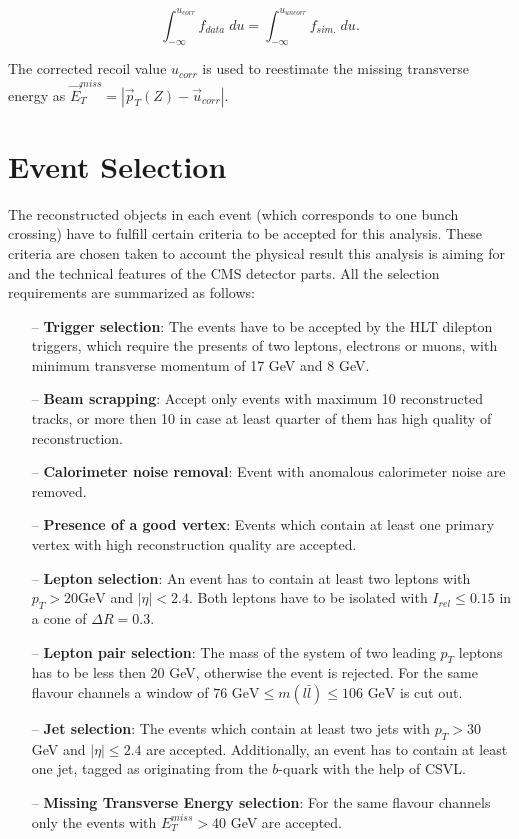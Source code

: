 \begin{equation}
 \int_{-\infty}^{u_{corr}} f_{data}\; du = \int_{-\infty}^{u_{uncorr}} f_{sim.}\; du.
\end{equation}

The corrected recoil value $u_{corr}$ is used to reestimate the missing transverse energy as $\vec{E}_{T}^{miss} = | \vec{p}_{T}(Z) - \vec{u}_{corr} |$.

\section{Event Selection}

The reconstructed objects in each event (which corresponds to one bunch crossing) have to fulfill certain criteria to be accepted for this analysis. These 
criteria are chosen taken to account the physical result this analysis is aiming for and the technical features of the CMS detector parts.
All the selection requirements are summarized as follows:

\begin{itemize}
 \item [--] \textbf{Trigger selection}: The events have to be accepted by the HLT dilepton triggers, which require the presents of two leptons, electrons or muons, with
 minimum transverse momentum of 17 GeV and 8 GeV. 
 \item [--] \textbf{Beam scrapping}: Accept only events with maximum 10 reconstructed tracks, or more then 10 in case at least quarter of them has high quality of reconstruction.
 \item [--] \textbf{Calorimeter noise removal}: Event with anomalous calorimeter noise are removed.
 \item [--] \textbf{Presence of a good vertex}: Events which contain at least one primary vertex with high reconstruction quality are accepted.
 \item [--] \textbf{Lepton selection}: An event has to contain at least two leptons with $p_{T} > 20 \textrm{GeV}$ and $|\eta| < 2.4$. Both leptons have to be isolated with 
 $I_{rel}\leq 0.15$ in a cone of $\Delta R = 0.3$.
 \item [--] \textbf{Lepton pair selection}: The mass of the system of two leading $p_{T}$ leptons has to be less then 20 GeV, otherwise the event is rejected. For the
 same flavour channels a window of $76\textrm{ GeV}\leq m(l\bar{l}) \leq 106\textrm{ GeV}$ is cut out.
 \item [--] \textbf{Jet selection}: The events which contain at least two jets with $p_{T} > 30$ GeV and $|\eta| \leq 2.4$ are accepted. Additionally, an event has to contain
 at least one jet, tagged as originating from the $b$-quark with the help of CSVL.
 
 \item [--] \textbf{Missing Transverse Energy selection}: For the same flavour channels only the events with $E_{T}^{miss} > 40$ GeV are accepted.
\end{itemize}

